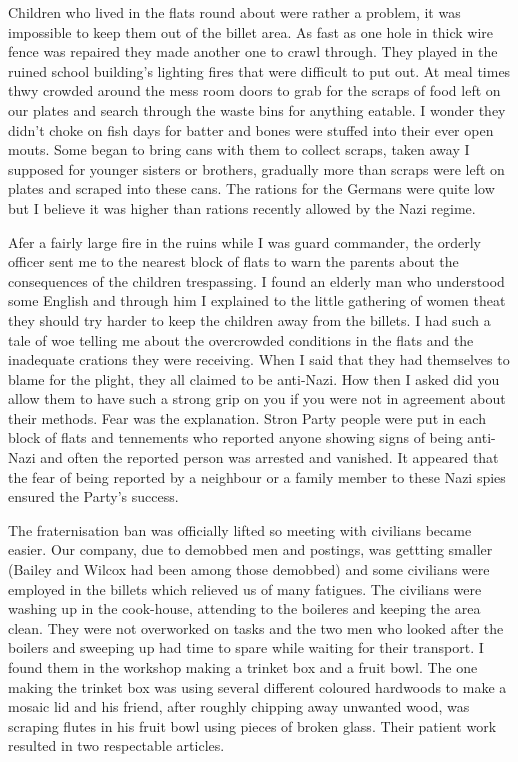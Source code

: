 Children who lived in the flats round about were rather a problem, it
was impossible to keep them out of the billet area. As fast as one
hole in thick wire fence was repaired they made another one to crawl
through. They played in the ruined school building's lighting fires
that were difficult to put out. At meal times thwy crowded around the
mess room doors to grab for the scraps of food left on our plates and
search through the waste bins for anything eatable. I wonder they
didn't choke on fish days for batter and bones were stuffed into their
ever open mouts. Some began to bring cans with them to collect scraps,
taken away I supposed for younger sisters or brothers, gradually more
than scraps were left on plates and scraped into these cans. The
rations for the Germans were quite low but I believe it was higher
than rations recently allowed by the Nazi regime.

Afer a fairly large fire in the ruins while I was guard commander, the
orderly officer sent me to the nearest block of flats to warn the
parents about the consequences of the children trespassing. I found an
elderly man who understood some English and through him I explained to
the little gathering of women theat they should try harder to keep the
children away from the billets. I had such a tale of woe telling me
about the overcrowded conditions in the flats and the inadequate
crations they were receiving. When I said that they had themselves to
blame for the plight, they all claimed to be anti-Nazi. How then I
asked did you allow them to have such a strong grip on you if you were
not in agreement about their methods. Fear was the explanation. Stron
Party people were put in each block of flats and tennements who
reported anyone showing signs of being anti-Nazi and often the
reported person was arrested and vanished. It appeared that the fear
of being reported by a neighbour or a family member to these Nazi
spies ensured the Party's success.

The fraternisation ban was officially lifted so meeting with civilians
became easier. Our company, due to demobbed men and postings, was
gettting smaller (\lieutenant Bailey and \sergeant Wilcox had been among those
demobbed) and some civilians were employed in the billets which
relieved us of many fatigues. The civilians were washing up in the
cook-house, attending to the boileres and keeping the area clean. They
were not overworked on tasks and the two men who looked after the
boilers and sweeping up had time to spare while waiting for their
transport. I found them in the workshop making a trinket box and a
fruit bowl. The one making the trinket box was using several different
coloured hardwoods to make a mosaic lid and his friend, after roughly
chipping away unwanted wood, was scraping flutes in his fruit bowl
using pieces of broken glass. Their patient work resulted in two
respectable articles.
